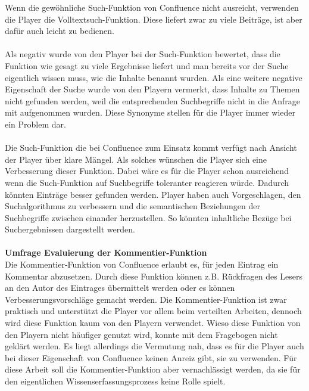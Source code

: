 \documentclass[a4paper,12pt]{scrartcl}
\begin{document}
Wenn die gewöhnliche Such-Funktion von Confluence nicht ausreicht, verwenden die Player die Volltextsuch-Funktion. Diese liefert zwar zu viele Beiträge, ist aber dafür auch leicht zu bedienen.  
\\\\
Als negativ wurde von den Player bei der Such-Funktion bewertet, dass die Funktion wie gesagt zu viele Ergebnisse liefert und man bereits vor der Suche eigentlich wissen muss, wie die Inhalte benannt wurden. Als eine weitere negative Eigenschaft der Suche wurde von den Playern vermerkt, dass Inhalte zu Themen nicht gefunden werden, weil die entsprechenden Suchbegriffe nicht in die Anfrage mit aufgenommen wurden. Diese Synonyme stellen für die Player immer wieder ein Problem dar. 
\\\\
Die Such-Funktion die bei Confluence zum Einsatz kommt verfügt nach Ansicht der Player über klare Mängel. Als solches wünschen die Player sich eine Verbesserung dieser Funktion. Dabei wäre es für die Player schon ausreichend wenn die Such-Funktion auf Suchbegriffe toleranter reagieren würde. Dadurch könnten Einträge besser gefunden werden. Player haben auch Vorgeschlagen, den Suchalgorithmus zu verbessern und die semantischen Beziehungen der Suchbegriffe zwischen einander herzustellen. So könnten inhaltliche Bezüge bei Suchergebnissen dargestellt werden. 
\\\\
\textbf{Umfrage Evaluierung der Kommentier-Funktion}\\
Die Kommentier-Funktion von Confluence erlaubt es, für jeden Eintrag ein Kommentar abzusetzen. Durch diese Funktion können z.B. Rückfragen des Lesers an den Autor des Eintrages übermittelt werden oder es können Verbesserungsvorschläge gemacht werden. Die Kommentier-Funktion ist zwar praktisch und unterstützt die Player vor allem beim verteilten Arbeiten, dennoch wird diese Funktion kaum von den Playern verwendet. Wieso diese Funktion von den Playern nicht häufiger genutzt wird, konnte mit dem Fragebogen nicht geklärt werden. Es liegt allerdings die Vermutung nah, dass es für die Player auch bei dieser Eigenschaft von Confluence keinen Anreiz gibt, sie zu verwenden. Für diese Arbeit soll die Kommentier-Funktion aber vernachlässigt werden, da sie für den eigentlichen Wissenserfassungsprozess keine Rolle spielt.
\end{document}
